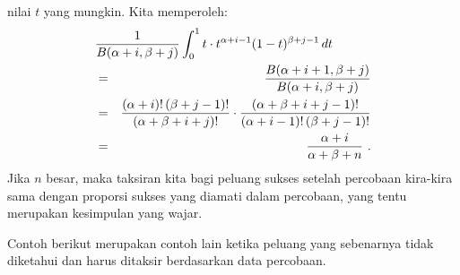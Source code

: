 \begin{example}
nilai $t$ yang mungkin.  Kita memperoleh:
\begin{eqnarray*}
\lefteqn{\frac 1{B(\alpha + i,\beta + j)} 
\int_0^1 t\cdot t^{\alpha + i - 1}(1 - t)^{\beta + j - 1}\,dt}
\\
  & = & \frac {B(\alpha + i + 1,\beta + j)}{B(\alpha + i,\beta + j)} \\
  & = & \frac {(\alpha + i)!\,(\beta + j - 1)!}{(\alpha + \beta + i + j)!} \cdot 
\frac {(\alpha + \beta + i + j - 1)!}{(\alpha + i - 1)!\,(\beta + j - 1)!} \\
  & = & \frac {\alpha + i}{\alpha + \beta + n}\ .
\end{eqnarray*}
Jika $n$ besar, maka taksiran kita bagi peluang sukses setelah percobaan
kira-kira sama dengan proporsi sukses yang diamati dalam percobaan, yang
tentu merupakan kesimpulan yang wajar.
\end{example}

Contoh berikut merupakan contoh lain ketika peluang yang sebenarnya tidak diketahui dan harus
ditaksir berdasarkan data percobaan.


